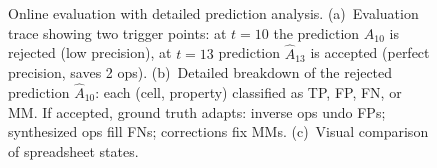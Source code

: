 \documentclass{article}
\theoremstyle{plain}
\theoremstyle{definition}
\theoremstyle{remark}
\begin{document}
\begin{figure}[tb]
\caption{Online evaluation with detailed prediction analysis. (a)~Evaluation trace showing two trigger points: at $t{=}10$ the prediction $\hat{A}_{10}$ is rejected (low precision), at $t{=}13$ prediction $\hat{A}_{13}$ is accepted (perfect precision, saves 2 ops). (b)~Detailed breakdown of the rejected prediction $\hat{A}_{10}$: each (cell, property) classified as TP, FP, FN, or MM. If accepted, ground truth adapts: {\color{undocolor}inverse ops} undo FPs; {\color{synthcolor}synthesized ops} fill FNs; {\color{fixcolor}corrections} fix MMs. (c)~Visual comparison of spreadsheet states.}
\label{fig:eval_metrics}
\end{figure}
\end{document}

